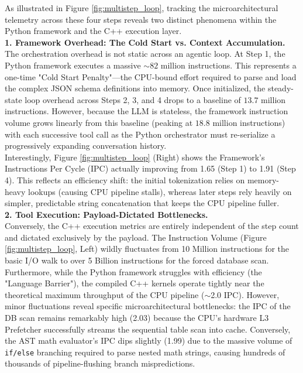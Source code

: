 \documentclass[10pt, letterpaper]{article}
\begin{document}
As illustrated in Figure \ref{fig:multistep_loop}, tracking the microarchitectural telemetry across these four steps reveals two distinct phenomena within the Python framework and the C++ execution layer. \\

\noindent \textbf{1. Framework Overhead: The Cold Start vs. Context Accumulation.} \\
The orchestration overhead is not static across an agentic loop. At Step 1, the Python framework executes a massive $\sim 82$ million instructions. This represents a one-time "Cold Start Penalty"---the CPU-bound effort required to parse and load the complex JSON schema definitions into memory. Once initialized, the steady-state loop overhead across Steps 2, 3, and 4 drops to a baseline of $13.7$ million instructions. However, because the LLM is stateless, the framework instruction volume grows linearly from this baseline (peaking at $18.8$ million instructions) with each successive tool call as the Python orchestrator must re-serialize a progressively expanding conversation history. \\

\noindent Interestingly, Figure \ref{fig:multistep_loop} (Right) shows the Framework's Instructions Per Cycle (IPC) actually improving from 1.65 (Step 1) to 1.91 (Step 4). This reflects an efficiency shift: the initial tokenization relies on memory-heavy lookups (causing CPU pipeline stalls), whereas later steps rely heavily on simpler, predictable string concatenation that keeps the CPU pipeline fuller. \\

\noindent \textbf{2. Tool Execution: Payload-Dictated Bottlenecks.} \\
Conversely, the C++ execution metrics are entirely independent of the step count and dictated exclusively by the payload. The Instruction Volume (Figure \ref{fig:multistep_loop}, Left) wildly fluctuates from 10 Million instructions for the basic I/O walk to over 5 Billion instructions for the forced database scan. \\

\noindent Furthermore, while the Python framework struggles with efficiency (the "Language Barrier"), the compiled C++ kernels operate tightly near the theoretical maximum throughput of the CPU pipeline ($\sim$2.0 IPC). However, minor fluctuations reveal specific microarchitectural bottlenecks: the IPC of the DB scan remains remarkably high (2.03) because the CPU's hardware L3 Prefetcher successfully streams the sequential table scan into cache. Conversely, the AST math evaluator's IPC dips slightly (1.99) due to the massive volume of \texttt{if/else} branching required to parse nested math strings, causing hundreds of thousands of pipeline-flushing branch mispredictions. \\
\end{document}

